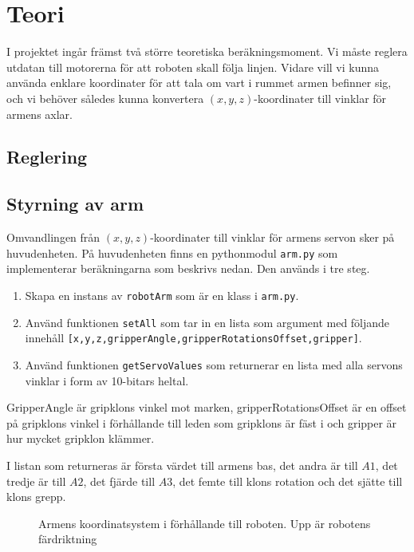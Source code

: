 \section{Teori}
I projektet ingår främst två större teoretiska beräkningsmoment. Vi måste reglera utdatan till motorerna för att roboten skall följa linjen. Vidare vill vi kunna använda enklare koordinater för att tala om vart i rummet armen befinner sig, och vi behöver således kunna konvertera $(x,y,z)$-koordinater till vinklar för armens axlar.

\subsection{Reglering}

\subsection{Styrning av arm}
Omvandlingen från $(x,y,z)$-koordinater till vinklar för armens servon sker på huvudenheten. På huvudenheten finns en pythonmodul \texttt{arm.py} som implementerar beräkningarna som beskrivs nedan. Den används i tre steg.
\begin{enumerate}
	\item Skapa en instans av \texttt{robotArm} som är en klass i \texttt{arm.py}.
	\item Använd funktionen \texttt{setAll} som tar in en lista som argument med följande innehåll \newline \texttt{[x,y,z,gripperAngle,gripperRotationsOffset,gripper]}.
	\item Använd funktionen \texttt{getServoValues} som returnerar en lista med alla servons vinklar i form av 10-bitars heltal.
\end{enumerate}

GripperAngle är gripklons vinkel mot marken, gripperRotationsOffset är en offset på gripklons vinkel i förhållande till leden som gripklons är fäst i och gripper är hur mycket gripklon klämmer.

I listan som returneras är första värdet till armens bas, det andra är till $A1$, det tredje är till $A2$, det fjärde till $A3$, det femte till klons rotation och det sjätte till klons grepp.

\begin{figure}[h!]
	\centerline{}
	\caption{Armens koordinatsystem i förhållande till roboten. Upp är robotens färdriktning}
\end{figure}

